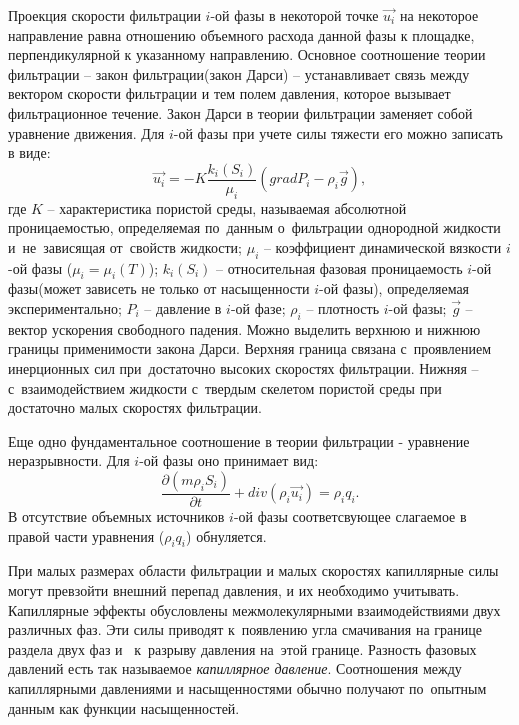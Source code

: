 Проекция скорости фильтрации $i$-ой фазы в некоторой точке
$\overrightarrow{u_i}$ на некоторое направление равна отношению объемного
расхода данной фазы к площадке, перпендикулярной к указанному направлению.
Основное соотношение теории фильтрации -- закон фильтрации(закон Дарси) -- устанавливает 
связь между вектором скорости фильтрации и тем полем давления, которое вызывает 
фильтрационное течение. Закон Дарси в теории фильтрации заменяет собой уравнение 
движения. Для $i$-ой фазы при учете силы тяжести его можно записать в виде:
\begin{equation}
\label{Darcy}
  \overrightarrow{u_i}=-K \frac{k_i(S_i)}{{\mu}_i}(grad P_i - {\rho}_i\overrightarrow{g}),
\end{equation}
где $K$ -- характеристика пористой среды, называемая
абсолютной проницаемостью, определяемая по~данным о~фильтрации однородной
жидкости и~не~зависящая от~свойств жидкости; $\mu_i$ -- коэффициент динамической
вязкости $i$-ой фазы ($\mu_i=\mu_i(T)$); $k_i(S_i)$ -- относительная фазовая проницаемость $i$-ой фазы(может зависеть 
не только от насыщенности $i$-ой фазы), определяемая
экспериментально; $P_i$ -- давление в $i$-ой фазе; ${\rho}_i$ -- плотность $i$-ой фазы;
$\overrightarrow{g}$ -- вектор ускорения свободного падения.
Можно выделить верхнюю и нижнюю границы применимости закона Дарси\cite{Aziz-Settari}. Верхняя граница связана 
с~проявлением инерционных сил при~достаточно высоких скоростях фильтрации. Нижняя --
с~взаимодействием жидкости с~твердым скелетом пористой среды при достаточно малых 
скоростях фильтрации.

Еще одно фундаментальное соотношение в теории фильтрации - уравнение неразрывности. 
Для $i$-ой фазы оно принимает вид:
 \begin{equation}
 \label{mass}
 	 \frac{\partial (m \rho_i S_i)}{\partial t}+ div(\rho_i \overrightarrow{u_i}) = \rho_i q_i.
 \end{equation}
В отсутствие объемных источников $i$-ой фазы
соответсвующее слагаемое в правой части уравнения (${\rho_i}q_i$) обнуляется.

При малых размерах области фильтрации и малых скоростях капиллярные силы могут
превзойти внешний перепад давления, и их необходимо учитывать.
Капиллярные эффекты обусловлены межмолекулярными взаимодействиями двух различных
фаз. Эти силы приводят к~появлению угла смачивания на границе раздела двух фаз и~
к~разрыву давления на~этой границе. Разность фазовых давлений есть так
называемое \textit{капиллярное давление}. Соотношения между капиллярными
давлениями и насыщенностями обычно получают по~опытным данным как функции насыщенностей.

